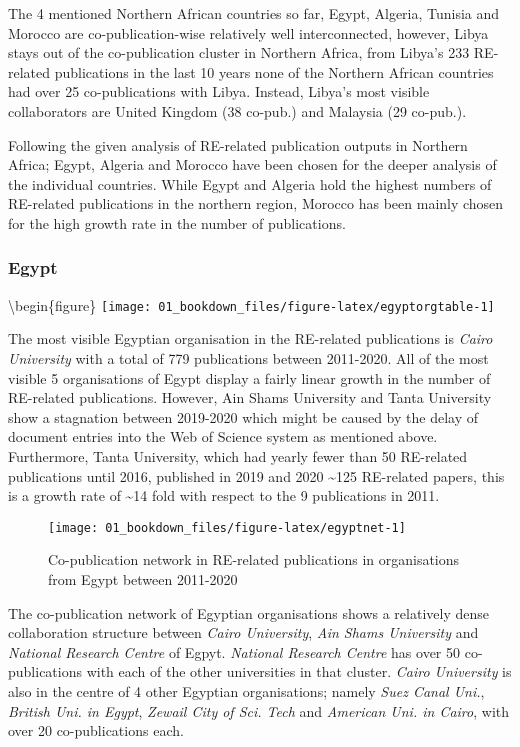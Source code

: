 \documentclass[12pt,twoside]{report}
\begin{document}
The 4 mentioned Northern African countries so far, Egypt, Algeria, Tunisia and Morocco are co-publication-wise relatively well interconnected, however, Libya stays out of the co-publication cluster in Northern Africa, from Libya's 233 RE-related publications in the last 10 years none of the Northern African countries had over 25 co-publications with Libya. Instead, Libya's most visible collaborators are United Kingdom (38 co-pub.) and Malaysia (29 co-pub.).

Following the given analysis of RE-related publication outputs in Northern Africa;
Egypt, Algeria and Morocco have been chosen for the deeper analysis of the individual countries.
While Egypt and Algeria hold the highest numbers of RE-related publications in the northern
region, Morocco has been mainly chosen for the high growth rate in the number of publications.

\hypertarget{egypt}{%
\subsubsection{Egypt}\label{egypt}}

\textbackslash begin\{figure\}
\texttt{[image: 01\_bookdown\_files/figure-latex/egyptorgtable-1]}

The most visible Egyptian organisation in the RE-related publications is \emph{Cairo University} with a total of 779 publications between 2011-2020. All of the most visible 5 organisations of Egypt display a fairly linear growth in the number of RE-related publications. However, Ain Shams University and Tanta University show a stagnation between 2019-2020 which might be caused by the delay of document entries into the Web of Science system as mentioned above. Furthermore, Tanta University, which had yearly fewer than 50 RE-related publications until 2016, published in 2019 and 2020 \textasciitilde125 RE-related papers, this is a growth rate of \textasciitilde14 fold with respect to the 9 publications in 2011.

\begin{figure}
\texttt{[image: 01\_bookdown\_files/figure-latex/egyptnet-1]} \caption{Co-publication network in RE-related publications in organisations from Egypt between 2011-2020}\label{fig:egyptnet}
\end{figure}

The co-publication network of Egyptian organisations shows a relatively dense collaboration structure between \emph{Cairo University}, \emph{Ain Shams University} and \emph{National Research Centre} of Egpyt. \emph{National Research Centre} has over 50 co-publications with each of the other universities in that cluster. \emph{Cairo University} is also in the centre of 4 other Egyptian organisations; namely \emph{Suez Canal Uni.}, \emph{British Uni. in Egypt}, \emph{Zewail City of Sci. Tech} and \emph{American Uni. in Cairo}, with over 20 co-publications each.
\end{document}
